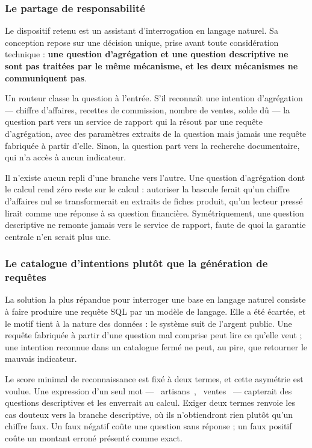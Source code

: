 \subsubsection{Le partage de responsabilité}

Le dispositif retenu est un assistant d'interrogation en langage naturel. Sa conception repose sur une décision unique, prise avant toute considération technique : \textbf{une question d'agrégation et une question descriptive ne sont pas traitées par le même mécanisme, et les deux mécanismes ne communiquent pas}.

Un routeur classe la question à l'entrée. S'il reconnaît une intention d'agrégation --- chiffre d'affaires, recettes de commission, nombre de ventes, solde dû --- la question part vers un service de rapport qui la résout par une requête d'agrégation, avec des paramètres extraits de la question mais jamais une requête fabriquée à partir d'elle. Sinon, la question part vers la recherche documentaire, qui n'a accès à aucun indicateur.

Il n'existe aucun repli d'une branche vers l'autre. Une question d'agrégation dont le calcul rend zéro reste sur le calcul : autoriser la bascule ferait qu'un chiffre d'affaires nul se transformerait en extraits de fiches produit, qu'un lecteur pressé lirait comme une réponse à sa question financière. Symétriquement, une question descriptive ne remonte jamais vers le service de rapport, faute de quoi la garantie centrale n'en serait plus une.

\subsubsection{Le catalogue d'intentions plutôt que la génération de requêtes}

La solution la plus répandue pour interroger une base en langage naturel consiste à faire produire une requête SQL par un modèle de langage. Elle a été écartée, et le motif tient à la nature des données : le système suit de l'argent public. Une requête fabriquée à partir d'une question mal comprise peut lire ce qu'elle veut ; une intention reconnue dans un catalogue fermé ne peut, au pire, que retourner le mauvais indicateur.

Le score minimal de reconnaissance est fixé à deux termes, et cette asymétrie est voulue. Une expression d'un seul mot --- \guillemotleft~artisans~\guillemotright, \guillemotleft~ventes~\guillemotright{} --- capterait des questions descriptives et les enverrait au calcul. Exiger deux termes renvoie les cas douteux vers la branche descriptive, où ils n'obtiendront rien plutôt qu'un chiffre faux. Un faux négatif coûte une question sans réponse ; un faux positif coûte un montant erroné présenté comme exact.

